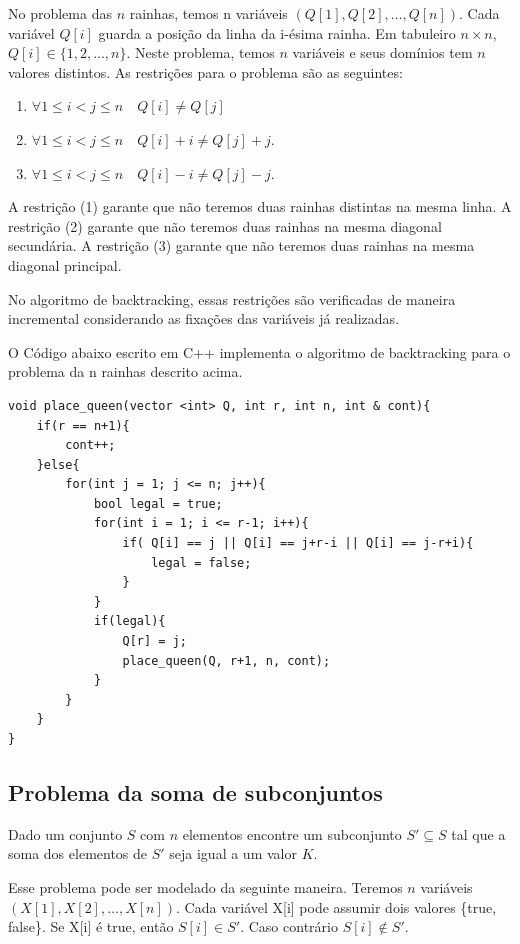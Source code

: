 No problema das $n$ rainhas, temos n variáveis $(Q[1],Q[2], \ldots, Q[n])$. Cada variável $Q[i]$ guarda a posição da linha da i-ésima rainha. Em tabuleiro $n \times n$, $Q[i] \in \{1, 2, \ldots, n\}$. Neste problema, temos $n$ variáveis e seus domínios tem $n$ valores distintos.  As restrições para o problema são as seguintes:

\begin{enumerate}
    \item $\forall { 1 \leq  i < j \leq n} \quad Q[i] \neq Q[j] $
    \item $\forall { 1 \leq  i < j \leq n} \quad Q[i] + i \neq Q[j] + j$.
    \item $\forall { 1 \leq  i < j \leq n} \quad Q[i] - i \neq Q[j] - j$.
\end{enumerate}

A restrição (1) garante que não teremos duas rainhas distintas na mesma linha. A restrição (2) garante que não teremos duas rainhas na mesma diagonal secundária. A restrição (3) garante que não teremos duas rainhas na mesma diagonal principal. 

No algoritmo de backtracking, essas restrições são verificadas de maneira incremental considerando as fixações das variáveis já realizadas.

O Código abaixo escrito em C++ implementa o algoritmo de backtracking para o problema da n rainhas descrito acima.

\begin{verbatim}
void place_queen(vector <int> Q, int r, int n, int & cont){
    if(r == n+1){
        cont++;
    }else{
        for(int j = 1; j <= n; j++){
            bool legal = true;
            for(int i = 1; i <= r-1; i++){
                if( Q[i] == j || Q[i] == j+r-i || Q[i] == j-r+i){
                    legal = false;
                }
            }
            if(legal){
                Q[r] = j;
                place_queen(Q, r+1, n, cont);
            }
        }
    }
}

\end{verbatim}

\subsection{Problema da soma de subconjuntos}

Dado um conjunto $S$ com $n$ elementos encontre um subconjunto $S' \subseteq S$ tal que a soma dos elementos de $S'$ seja igual a um valor $K$.

Esse problema pode ser modelado da seguinte maneira. Teremos $n$ variáveis $(X[1], X[2], \ldots, X[n])$. Cada variável X[i] pode assumir dois valores \{true, false\}. Se X[i] é true, então $S[i] \in S'$. Caso contrário $S[i] \not \in S'$.

